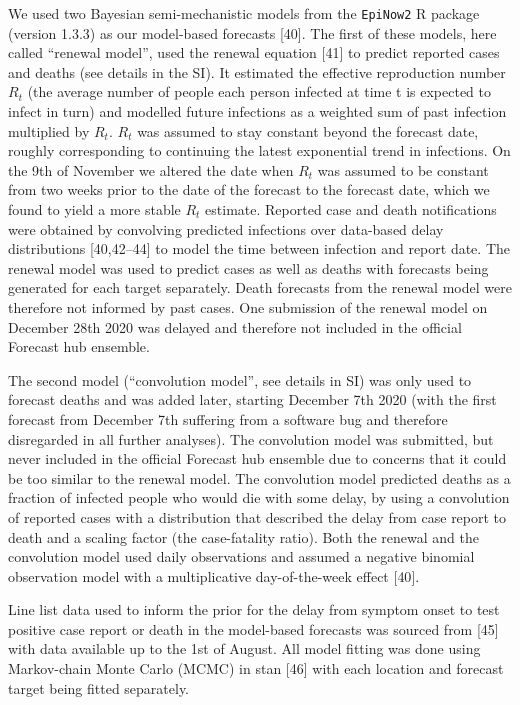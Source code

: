 \documentclass[10pt,letterpaper]{article}
\providecommand{\DIFaddtex}[1]{{\protect\color{blue}\uwave{#1}}} %
\providecommand{\DIFaddbegin}{} %
\providecommand{\DIFaddend}{} %
\providecommand{\DIFadd}[1]{\texorpdfstring{\DIFaddtex{#1}}{#1}} %
\newcommand{\DIFaddincludegraphics}[2][]{{\color{blue}\fbox{\DIFOincludegraphics[#1]{#2}}}} %
\DeclareRobustCommand{\DIFaddbegin}{\DIFOaddbegin \let\includegraphics\DIFaddincludegraphics} %
\DeclareRobustCommand{\DIFaddend}{\DIFOaddend \let\includegraphics\DIFOincludegraphics} %
\begin{document}
We used two Bayesian semi-mechanistic models from the \texttt{EpiNow2} R
package (version 1.3.3) as our model-based forecasts {[}40{]}. The first
of these models, here called ``renewal model'', used the renewal
equation {[}41{]} to predict reported cases and deaths (see details in
\DIFaddbegin {} \DIFadd{in }\DIFaddend the SI). It estimated the effective
reproduction number \(R_t\) (the average number of people each person
infected at time t is expected to infect in turn) and modelled future
infections as a weighted sum of past infection multiplied by \(R_t\).
\(R_t\) was assumed to stay constant beyond the forecast date, roughly
corresponding to continuing the latest exponential trend in infections.
On the 9th of November we altered the date when \(R_t\) was assumed to
be constant from two weeks prior to the date of the forecast to the
forecast date, which we found to yield a more stable \(R_t\) estimate.
Reported case and death notifications were obtained by convolving
predicted infections over data-based delay distributions {[}40,42--44{]}
to model the time between infection and report date. The renewal model
was used to predict cases as well as deaths with forecasts being
generated for each target separately. Death forecasts from the renewal
model were therefore not informed by past cases. One submission of the
renewal model on December 28th 2020 was delayed and therefore not
included in the official Forecast hub ensemble.

The second model (``convolution model'', see details in SI) was only
used to forecast deaths and was added later, starting December 7th 2020
(with the first forecast from December 7th suffering from a software bug
and therefore disregarded in all further analyses). The convolution
model was submitted, but never included in the official Forecast hub
ensemble due to concerns that it could be too similar to the renewal
model. The convolution model predicted deaths as a fraction of infected
people who would die with some delay, by using a convolution of reported
cases with a distribution that described the delay from case report to
death and a scaling factor (the case-fatality ratio). Both the renewal
and the convolution model used daily observations and assumed a negative
binomial observation model with a multiplicative day-of-the-week effect
{[}40{]}.

Line list data used to inform the prior for the delay from symptom onset
to test positive case report or death in the model-based forecasts was
sourced from {[}45{]} with data available up to the 1st of August. All
model fitting was done using Markov-chain Monte Carlo (MCMC) in stan
{[}46{]} with each location and forecast target being fitted separately.
\end{document}
